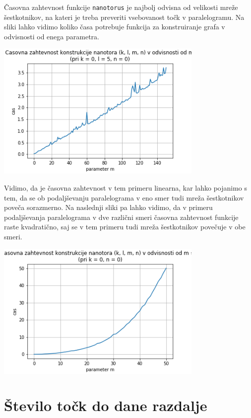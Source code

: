\documentclass[a4paper, 10 pt, titlepage]{article}
\begin{document}
Časovna zahtevnost funkcije \texttt{nanotorus} je najbolj odvisna od velikosti mreže šestkotnikov, na kateri je treba preveriti vsebovanost točk v paralelogramu. Na sliki lahko vidimo koliko časa potrebuje funkcija za konstruiranje grafa v odvisnosti od enega parametra.
\begin{center}
\includegraphics[width=10cm]{zahtevnost1}
\end{center}
\vspace{1cm}

Vidimo, da je časovna zahtevnost v tem primeru linearna, kar lahko pojanimo s tem, da se ob podaljševanju paralelograma v eno smer tudi mreža šestkotnikov poveča sorazmerno. Na naslednji sliki pa lahko vidimo, da v primeru podaljševanja paralelograma v dve različni smeri časovna zahtevnost funkcije raste kvadratično, saj se v tem primeru tudi mreža šestkotnikov povečuje v obe smeri.

\begin{center}
\includegraphics[width=10cm]{zahtevnost2}
\end{center}
\vspace{1cm}

\pagebreak


\section{Število točk do dane razdalje}
\end{document}
